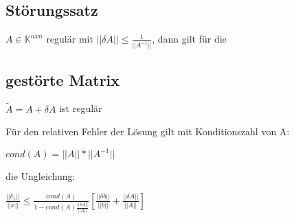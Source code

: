 \documentclass[12pt,a4paper]{article} %
\newcommand*\tab[1][1cm]{\hspace*{#1}}
\begin{document}
	\subsection{Störungssatz}
	
	$A \in \mathbb{K}^{n x n}$ regulär mit $||\delta A|| \le \frac{1}{||A^{-1}||}$, dann gilt für die
	
	\subsection{gestörte Matrix}
	
	$\tilde{A} = A + \delta A$ ist regulär
	
	Für den relativen Fehler der Lösung gilt mit Konditionszahl von A:
	
	\tab $cond(A) = ||A|| * ||A^{-1}||$
	
	die Ungleichung:
	
	\tab $\frac{||\delta_x||}{||x||} \le \frac{cond(A)}{1 - cond(A) \frac{||\delta A||}{||A||}}\left[ \frac{||\delta b||}{||b||} + \frac{||\delta A||}{||A||}\right] $
	
\end{document}

